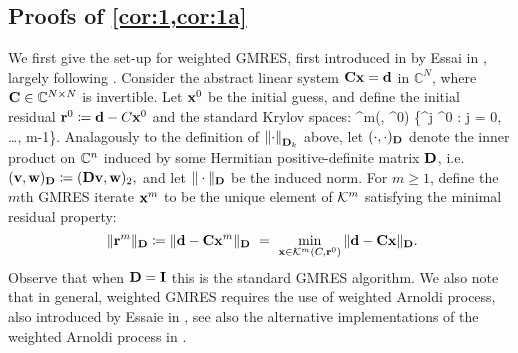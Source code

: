 %

\subsection{Proofs of \cref{cor:1,cor:1a}}\label{sec:mainproofs}

We first give the set-up for weighted GMRES, first introduced in by Essai in \cite{Es:98}, largely following \cite[Section 5]{GrSpVa:17}. Consider the abstract  linear system 
$\mathbf{C} \mathbf{x} = \mathbf{d}$
in $\mathbb{C}^N$, where $\mathbf{C} \in \mathbb C^{N\times N}$ is invertible. Let $\mathbf{x}^{0}$ be the initial guess, and define the initial residual $\mathbf{r}^0 \coloneqq \mathbf{d}- C \mathbf{x}^0$ and the standard Krylov spaces:  
\beqs  
\cK^m(\Cmat, \br^0) \de {}\big\{\matrixC^j \br^0 : j = 0, \ldots, m-1\big\}.
\eeqs
Analagously to the definition of $\NDk{\cdot}$ above, let $(\cdot , \cdot )_{\mathbf{D}}$ denote the inner product on $\mathbb C^n$ 
induced by some Hermitian positive-definite matrix $\mathbf{D}$, i.e.~
$(\mathbf{v},\mathbf{w})_{\mathbf{D}} \coloneqq (\mathbf{D} \mathbf{v}, \mathbf{w})_2,$
and let $\Vert \cdot \Vert_{\mathbf{D}}$ be the induced norm. For $m \geq 1$, define the $m$th GMRES iterate $\mathbf{x}^m$  to be  the unique element of $\mathcal K^m$ satisfying  the  
 minimal residual  property: 
$$ \ \Vert \mathbf{r}^m \Vert_{\mathbf{D}} \coloneqq \Vert \mathbf{d} - \mathbf{C} \mathbf{x}^m \Vert_{\mathbf{D}} \ = \ \min_{\mathbf{x} \in \mathcal K^m(C, \mathbf{r}^0)} \Vert {\mathbf{d}} - {\mathbf{C}} {\mathbf{x}} \Vert_{\mathbf{D}}. $$
Observe that when $\mathbf{D} = \mathbf{I}$ this is the standard GMRES algorithm. We also note that in general, weighted GMRES requires the use of weighted Arnoldi process, also introduced by Essaie in \cite{Es:98}, see also the alternative implementations of the weighted Arnoldi process in \cite{GuPe:14}.


